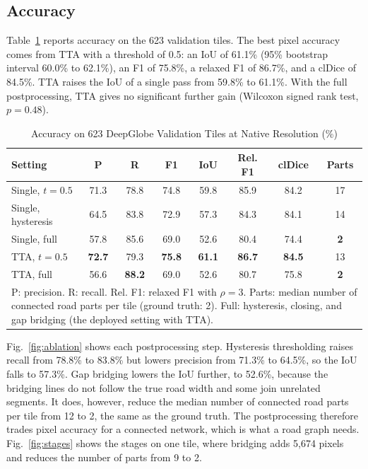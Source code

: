 \documentclass{ieeeaccess}
\begin{document}
\subsection{Accuracy}

Table~\ref{tab:acc} reports accuracy on the 623 validation tiles. The best pixel accuracy comes from TTA with a threshold of 0.5: an IoU of 61.1\% (95\% bootstrap interval 60.0\% to 62.1\%), an F1 of 75.8\%, a relaxed F1 of 86.7\%, and a clDice of 84.5\%. TTA raises the IoU of a single pass from 59.8\% to 61.1\%. With the full postprocessing, TTA gives no significant further gain (Wilcoxon signed rank test, $p = 0.48$).

\begin{table}[t]
\caption{Accuracy on 623 DeepGlobe Validation Tiles at Native Resolution (\%)}
\label{tab:acc}
\setlength{\tabcolsep}{3pt}
\tablebodyfont
\begin{tabular}{|l|c|c|c|c|c|c|c|}
\hline
Setting & P & R & F1 & IoU & Rel. F1 & clDice & Parts \\
\hline
Single, $t = 0.5$ & 71.3 & 78.8 & 74.8 & 59.8 & 85.9 & 84.2 & 17 \\
Single, hysteresis & 64.5 & 83.8 & 72.9 & 57.3 & 84.3 & 84.1 & 14 \\
Single, full & 57.8 & 85.6 & 69.0 & 52.6 & 80.4 & 74.4 & \textbf{2} \\
TTA, $t = 0.5$ & \textbf{72.7} & 79.3 & \textbf{75.8} & \textbf{61.1} & \textbf{86.7} & \textbf{84.5} & 13 \\
TTA, full & 56.6 & \textbf{88.2} & 69.0 & 52.6 & 80.7 & 75.8 & \textbf{2} \\
\hline
\multicolumn{8}{p{232pt}}{P: precision. R: recall. Rel. F1: relaxed F1 with $\rho = 3$. Parts: median number of connected road parts per tile (ground truth: 2). Full: hysteresis, closing, and gap bridging (the deployed setting with TTA).}
\end{tabular}
\end{table}

Fig.~\ref{fig:ablation} shows each postprocessing step. Hysteresis thresholding raises recall from 78.8\% to 83.8\% but lowers precision from 71.3\% to 64.5\%, so the IoU falls to 57.3\%. Gap bridging lowers the IoU further, to 52.6\%, because the bridging lines do not follow the true road width and some join unrelated segments. It does, however, reduce the median number of connected road parts per tile from 12 to 2, the same as the ground truth. The postprocessing therefore trades pixel accuracy for a connected network, which is what a road graph needs. Fig.~\ref{fig:stages} shows the stages on one tile, where bridging adds 5,674 pixels and reduces the number of parts from 9 to 2.
\end{document}
